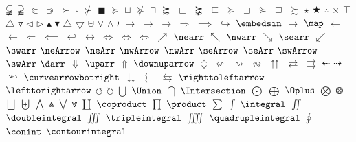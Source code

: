 $\varsubsetneqq$
$\varsupsetneqq$
$\Subset$
$\Supset$
$\succ$
$\square$
$\nsucc$
$\blacksquare$
$\succeq$
$\sqcup$
$\nsucceq$
$\sqcap$
$\succapprox$
$\sqsubset$
$\succnapprox$
$\sqsubseteq$
$\succcurlyeq$
$\sqsupset$
$\curlyeqsucc$
$\sqsupseteq$
$\succsim$
$\star$
$\bigstar$
$\therefore$
$\times$
$\top$
$\triangle$
$\triangledown$
$\triangleleft$
$\triangleright$
$\blacktriangle$
$\blacktriangledown$
$\bigtriangleup$
$\bigtriangledown$
$\uplus$
$\vee$
$\wedge$
$\wr$
$\rightarrow$
$\to$
$\longrightarrow$
$\Rightarrow$
$\implies$
$\hookrightarrow$
$\embedsin$
$\mapsto$
$\map$
$\leftarrow$
$\longleftarrow$
$\Leftarrow$
$\impliedby$
$\hookleftarrow$
$\leftrightarrow$
$\Leftrightarrow$
$\Longleftrightarrow$
$\iff$
$\nearrow$
$\nearr$
$\nwarrow$
$\nwarr$
$\searrow$
$\searr$
$\swarrow$
$\swarr$
$\neArrow$
$\neArr$
$\nwArrow$
$\nwArr$
$\seArrow$
$\seArr$
$\swArrow$
$\swArr$
$\darr$
$\Downarrow$
$\uparr$
$\Uparrow$
$\downuparrow$
$\Updownarrow$
$\leftsquigarrow$
$\rightsquigarrow$
$\leftrightsquigarrow$
$\upuparrows$
$\rightleftarrows$
$\rightrightarrows$
$\dashleftarrow$
$\dashrightarrow$
$\curvearrowleft$
$\curvearrowbotright$
$\downdownarrows$
$\leftleftarrows$
$\leftrightarrows$
$\righttoleftarrow$
$\lefttorightarrow$
$\circlearrowleft$
$\circlearrowright$
$\bigcup$
$\Union$
$\bigcap$
$\Intersection$
$\bigodot$
$\bigoplus$
$\Oplus$
$\bigotimes$
$\Otimes$
$\bigsqcup$
$\biguplus$
$\bigwedge$
$\Wedge$
$\bigvee$
$\Vee$
$\coprod$
$\coproduct$
$\prod$
$\product$
$\sum$
$\int$
$\integral$
$\iint$
$\doubleintegral$
$\iiint$
$\tripleintegral$
$\iiiint$
$\quadrupleintegral$
$\oint$
$\conint$
$\contourintegral$
